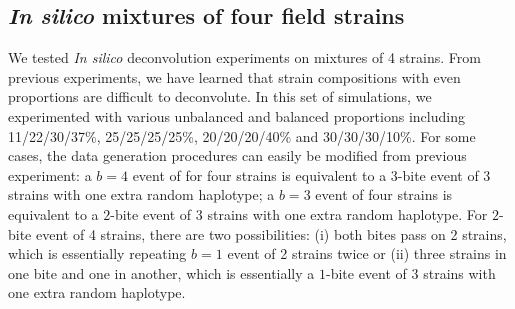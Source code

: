 \documentclass[9pt]{article}
\begin{document}
\subsection{{\it In silico} mixtures of four field strains}
We tested {\it In silico} deconvolution experiments on mixtures of 4 strains. From previous experiments, we have learned that strain compositions with even proportions are difficult to deconvolute. In this set of simulations, we experimented with various unbalanced and balanced proportions including 11/22/30/37\%, 25/25/25/25\%, 20/20/20/40\% and 30/30/30/10\%. For some cases, the data generation procedures can easily be modified from previous experiment: a $b=4$ event of for four strains is equivalent to a $3$-bite event of 3 strains with one extra random haplotype; a $b=3$ event of four strains is equivalent to a $2$-bite event of 3 strains with one extra random haplotype. For $2$-bite event of 4 strains, there are two possibilities: (i) both bites pass on 2 strains, which is essentially repeating $b=1$ event of 2 strains twice or (ii) three strains in one bite and one in another, which is essentially a $1$-bite event of 3 strains with one extra random haplotype.





%

\end{document}

